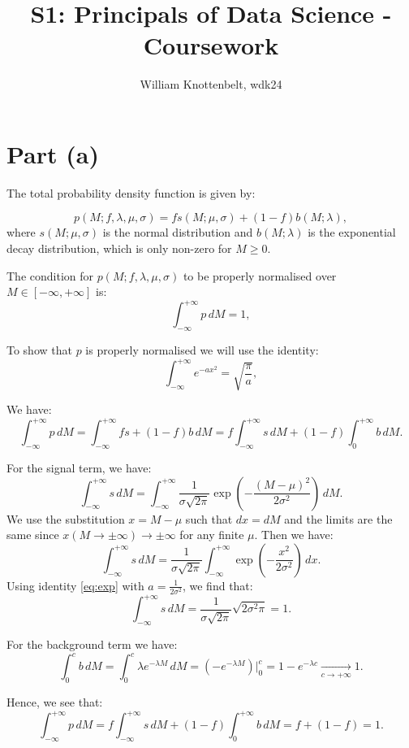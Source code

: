 \documentclass{article}
\title{S1: Principals of Data Science - Coursework}
\author{William Knottenbelt, wdk24}
\begin{document}
\maketitle

\section*{Part (a)}

The total probability density function is given by:

\[ p(M; f, \lambda, \mu, \sigma) = fs(M; \mu, \sigma) + (1-f)b(M; \lambda), \]
where $s(M; \mu, \sigma)$ is the normal distribution and $ b(M; \lambda)$ is the exponential decay distribution, which is only non-zero for $M \geq 0$.

The condition for $p(M; f, \lambda, \mu, \sigma)$ to be properly normalised over $M \in [-\infty, +\infty]$ is:
\[ \int_{-\infty}^{+\infty} p \, dM = 1, \]

To show that $p$ is properly normalised we will use the identity:
\begin{equation}
\int_{-\infty}^{+\infty} e^{-ax^2} = \sqrt{\frac{\pi}{a}},
\label{eq:exp}
\end{equation}

We have:
\[ 
\int_{-\infty}^{+\infty} p \, dM = 
\int_{-\infty}^{+\infty} fs + (1-f)b \, dM =
f\int_{-\infty}^{+\infty} s \, dM + 
(1-f)\int_{0}^{+\infty} b \, dM.
\]

For the signal term, we have:
\[
\int_{-\infty}^{+\infty} s \, dM =
\int_{-\infty}^{+\infty} \frac{1}{\sigma\sqrt{2\pi}} \exp\left(-\frac{(M - \mu)^2}{2\sigma^2}\right) \, dM.
\]
We use the substitution $x = M - \mu$ such that $dx = dM$ and the limits are the same since $x(M \to \pm\infty) \to \pm\infty$ for any finite $\mu$. Then we have:
\[
\int_{-\infty}^{+\infty} s \, dM =
\frac{1}{\sigma\sqrt{2\pi}} \int_{-\infty}^{+\infty} \exp\left(-\frac{x^2}{2\sigma^2}\right) \, dx.
\]
Using identity \eqref{eq:exp} with $a = \frac{1}{2\sigma^2}$, we find that:
\[
\int_{-\infty}^{+\infty} s \, dM =
\frac{1}{\sigma\sqrt{2\pi}} \sqrt{2\sigma^2\pi} = 1.
\]

For the background term we have:
\[
\int_{0}^{c} b \, dM =
\int_{0}^{c} \lambda e^{-\lambda M} \, dM =
(-e^{-\lambda M}) |_0^{c} =
1 - e^{-\lambda c}
\xrightarrow[c \to +\infty]{} 1.
\]

Hence, we see that:
\[ 
\int_{-\infty}^{+\infty} p \, dM = 
f\int_{-\infty}^{+\infty} s \, dM + 
(1-f)\int_{0}^{+\infty} b \, dM =
f + (1-f) = 1.
\]
\end{document}
